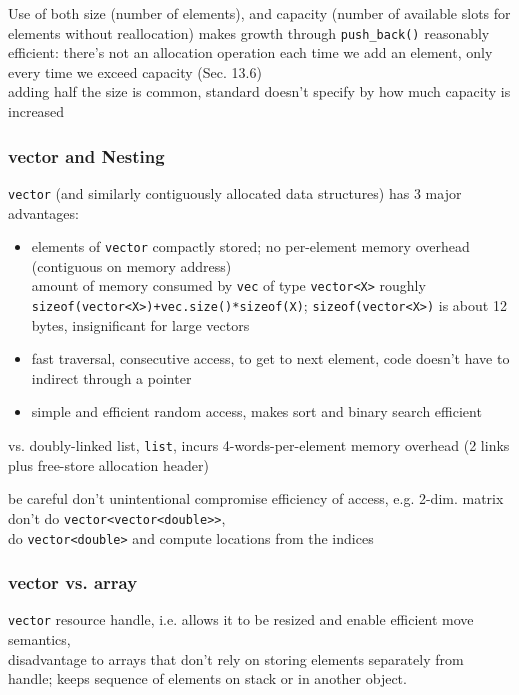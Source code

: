 \documentclass[10pt]{amsart}
\begin{document}
\begin{multicols*}{2}
Use of both size (number of elements), and capacity (number of available slots for elements without reallocation) makes growth through \verb|push_back()| reasonably efficient: there's not an allocation operation each time we add an element, only every time we exceed capacity (Sec. 13.6) \\
adding half the size is common, standard doesn't specify by how much capacity is increased

\subsubsection{vector and Nesting}

\verb|vector| (and similarly contiguously allocated data structures) has 3 major advantages:
\begin{itemize}
	\item elements of \verb|vector| compactly stored; no per-element memory overhead (contiguous on memory address) \\
	amount of memory consumed by \verb|vec| of type \verb|vector<X>| roughly \\
	\verb|sizeof(vector<X>)+vec.size()*sizeof(X)|; \verb|sizeof(vector<X>)| is about 12 bytes, insignificant for large vectors
	\item fast traversal, consecutive access, to get to next element, code doesn't have to indirect through a pointer 
	\item simple and efficient random access, makes sort and binary search efficient
\end{itemize}

vs. doubly-linked list, \verb|list|, incurs 4-words-per-element memory overhead (2 links plus free-store allocation header)

be careful don't unintentional compromise efficiency of access, e.g. 2-dim. matrix \\
don't do \verb|vector<vector<double>>|, \\
do \verb|vector<double>| and compute locations from the indices 

\subsubsection{vector vs. array}

\verb|vector| resource handle, i.e. allows it to be resized and enable efficient move semantics, \\
disadvantage to arrays that don't rely on storing elements separately from handle; keeps sequence of elements on stack or in another object.


\end{multicols*}
\end{document}
